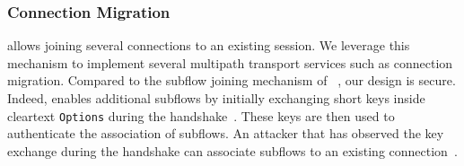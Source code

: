 %


\subsubsection{Connection Migration}\label{sec:multipath}

\tcpls allows joining several \tcp connections to an existing \tcpls session.
We leverage this mechanism to implement several multipath transport services
such as connection migration.
Compared to the subflow joining mechanism of
\mptcp~\cite{raiciu2012hard,hesmans2015smapp,hesmans2016enhanced}, our design is
secure. Indeed, \mptcp enables additional subflows by initially exchanging short keys
inside cleartext \tcp \texttt{Options} during the \tcp handshake~\cite{rfc6824, rfc8684}.
These keys are then used to authenticate the association of subflows.
An attacker that has observed the key exchange during the \tcp handshake can associate
subflows to an existing \mptcp connection~\cite{rfc6181}.


